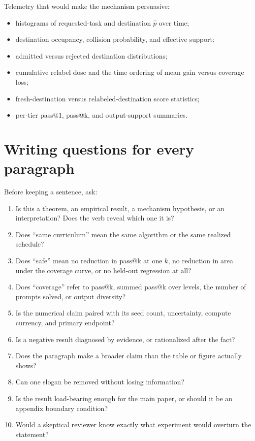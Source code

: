 \documentclass[11pt]{article}
\theoremstyle{definition}
\theoremstyle{remark}
\begin{document}
Telemetry that would make the mechanism persuasive:

\begin{itemize}[leftmargin=2em]
\item histograms of requested-task and destination $\widehat p$ over time;
\item destination occupancy, collision probability, and effective support;
\item admitted versus rejected destination distributions;
\item cumulative relabel dose and the time ordering of mean gain versus coverage loss;
\item fresh-destination versus relabeled-destination score statistics;
\item per-tier pass@1, pass@k, and output-support summaries.
\end{itemize}

\section{Writing questions for every paragraph}

Before keeping a sentence, ask:

\begin{enumerate}[leftmargin=2em]
\item Is this a theorem, an empirical result, a mechanism hypothesis, or an interpretation? Does the verb reveal which one it is?
\item Does ``same curriculum'' mean the same algorithm or the same realized schedule?
\item Does ``safe'' mean no reduction in pass@k at one $k$, no reduction in area under the coverage curve, or no held-out regression at all?
\item Does ``coverage'' refer to pass@k, summed pass@k over levels, the number of prompts solved, or output diversity?
\item Is the numerical claim paired with its seed count, uncertainty, compute currency, and primary endpoint?
\item Is a negative result diagnosed by evidence, or rationalized after the fact?
\item Does the paragraph make a broader claim than the table or figure actually shows?
\item Can one slogan be removed without losing information?
\item Is the result load-bearing enough for the main paper, or should it be an appendix boundary condition?
\item Would a skeptical reviewer know exactly what experiment would overturn the statement?
\end{enumerate}
\end{document}
